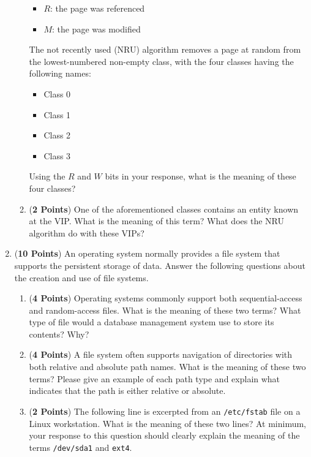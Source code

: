 \documentclass[12pt,epsf,psfig,graphics]{article}
\begin{document}
\begin{enumerate}
\begin{enumerate}
      \begin{itemize} 
        \item $R$: the page was referenced 
        \item $M$: the page was modified
      \end{itemize}
  
    The not recently used (NRU) algorithm removes a page at random from the lowest-numbered non-empty class, with the
    four classes having the following names:

    \begin{itemize}
      \item Class 0
      \item Class 1
      \item Class 2
      \item Class 3
    \end{itemize}
    
    Using the $R$ and $W$ bits in your response, what is the meaning of these four classes?

    \item ({\bf 2 Points}) One of the aforementioned classes contains an entity known at the VIP.  What is the meaning
      of this term? What does the NRU algorithm do with these VIPs?

  \end{enumerate}

  \newpage
  
\item ({\bf 10 Points}) An operating system normally provides a file system that supports the persistent storage of
  data.  Answer the following questions about the creation and use of file systems.

  \begin{enumerate}

    \item ({\bf 4 Points}) Operating systems commonly support both sequential-access and random-access files.  What is
      the meaning of these two terms?  What type of file would a database management system use to store its contents?
      Why?

    \item ({\bf 4 Points}) A file system often supports navigation of directories with both relative and absolute path
      names.  What is the meaning of these two terms?  Please give an example of each path type and explain what
      indicates that the path is either relative or absolute.

    \item ({\bf 2 Points})  The following line is excerpted from an {\tt /etc/fstab} file on a Linux workstation.  What
      is the meaning of these two lines? At minimum, your response to this question should clearly explain the meaning
      of the terms {\tt /dev/sda1} and {\tt ext4}. \\


\end{enumerate}
\end{enumerate}
\end{document}
